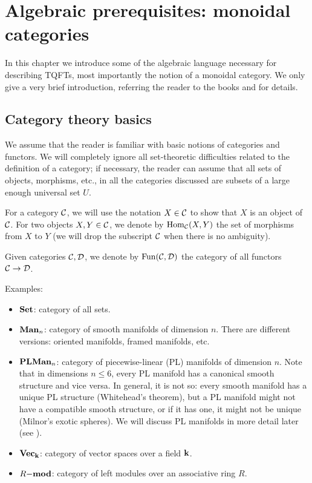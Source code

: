 \chapter{Algebraic prerequisites: monoidal categories}\label{c:categories}

In this chapter we introduce some of the algebraic language
necessary for describing TQFTs, most importantly the notion
of a monoidal category. We only give a very brief introduction,
referring the reader to the books  and 
for details.

\section{Category theory basics}\label{s:category-basics}
We assume that the reader is familiar with basic notions of categories and
functors. We will completely ignore all set-theoretic difficulties related
to the definition of a category; if necessary, the reader can assume that
all sets of objects, morphisms, etc., in all the categories discussed are
subsets of a large enough universal set $U$.

For a category $\calC$, we will use the notation $X\in \calC$ to show that
$X$ is an object of $\calC$. For two objects $X,Y\in\calC$, we denote by
$\Hom_\calC(X,Y)$ the set of morphisms from $X$ to $Y$ (we will drop
the subscript $\calC$ when there is no ambiguity).

Given categories $\calC, \calD$, we denote by $\Fun(\calC, \calD)$ the
category of all functors $\calC\to \calD$.

Examples:
\begin{itemize}
  \item $\sets$: category of all sets.
  \item $\smoothman_n$: category of smooth manifolds of dimension $n$.
    There are different versions: oriented manifolds, framed manifolds, etc.
  \item $\plman_n$: category of piecewise-linear (PL) manifolds of
    dimension $n$.
     Note that
    in dimensions $n\le 6$, every PL manifold has a canonical smooth structure
    and vice versa. In general, it is not so: every smooth manifold has
    a unique PL structure (Whitehead's theorem), but a PL manifold might
    not have a compatible smooth structure, or if it has one, it might not
    be unique (Milnor's exotic spheres). We will discuss PL manifolds in
    more detail later (see ).
  \item $\vect_\kk$: category of vector spaces over a field $\kk$.
  \item $R\mod$: category of left modules over an associative ring $R$.
\end{itemize}

